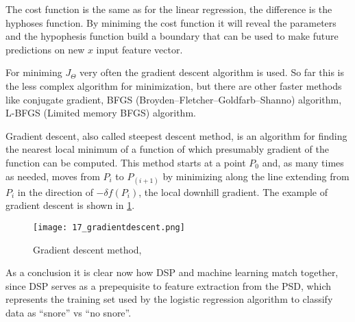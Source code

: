 The cost function is the same as for the linear regression, the difference is the hyphoses function. By miniming the cost function it will reveal the parameters and the hypophesis function build a boundary that can be used to make future predictions on new $x$ input feature vector. 

For miniming $J_{\Theta}$ very often the gradient descent algorithm is used. So far this is the less complex algorithm for minimization, but there are other faster methods like conjugate gradient, BFGS (Broyden–Fletcher–Goldfarb–Shanno) algorithm, L-BFGS (Limited memory BFGS) algorithm.

Gradient descent, also called steepest descent method, is an algorithm for finding the nearest local minimum of a function of which presumably gradient of the function can be computed. This method starts at a point $P_0$ and, as many times as needed, moves from $P_i$ to $P_{(i+1)}$ by minimizing along the line extending from $P_i$ in the direction of $-\delta f(P_i)$, the local downhill gradient. The example of gradient descent is shown in \ref{fig:gd}.

\begin{figure}[!ht]
\centering
  \texttt{[image: 17\_gradientdescent.png]}
\caption{Gradient descent method, \cite{gd}}
\label{fig:gd}
\end{figure}

As a conclusion it is clear now how DSP and machine learning match together, since DSP serves as a prepequisite to feature extraction from the PSD, which represents the training set used by the logistic regression algorithm to classify data as ``snore'' vs ``no snore''.

\clearpage


